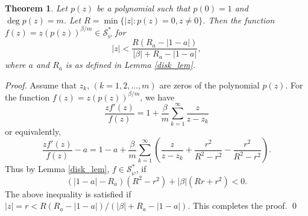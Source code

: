 \documentclass[12pt, reqno]{amsart}
\numberwithin{equation}{section}
\theoremstyle{plain}
\newtheorem{theorem}{Theorem}[section]
\theoremstyle{definition}
\theoremstyle{remark}
\begin{document}
\begin{theorem}
	Let $p(z)$ be a polynomial such that $p(0)=1$ and $\deg p(z)=m$. Let $R=\min\{|z| : p(z)=0, z\neq0\}$. Then the function $f(z)=z(p(z))^{\beta/m} \in \mathcal{S}^*_{\wp}$ for
	$$|z|<\frac{R(R_a-|1-a|)}{|\beta|+R_a-|1-a|},$$ 
	where $a$ and $R_a$ is as defined in Lemma \ref{disk_lem}.
\end{theorem}
\begin{proof}
	Assume that $z_k$, $(k=1,2,..., m)$ are zeros of the polynomial $p(z)$. For the function $f(z)=z(p(z))^{\beta/m}$, we have
	$$\frac{zf'(z)}{f(z)}=1+\frac{\beta}{m}\sum_{k=1}^{\infty}\frac{z}{z-z_k}$$
	or equivalently,
	$$\frac{zf'(z)}{f(z)}-a=1-a+\frac{\beta}{m}\sum_{k=1}^{\infty}\left(\frac{z}{z-z_k}+\frac{r^2}{R^2-r^2}-\frac{r^2}{R^2-r^2}\right).$$
	Thus by Lemma \ref{disk_lem}, $f\in \mathcal{S}^*_{\wp}$, if
	$$(|1-a|-R_a)(R^2-r^2)+|\beta|(Rr+r^2)<0.$$
	The above inequality is satisfied if $|z|=r<{R(R_a-|1-a|)}/{(|\beta|+R_a-|1-a|)}$. This completes the proof. \qed
\end{proof}



%
\end{document}
